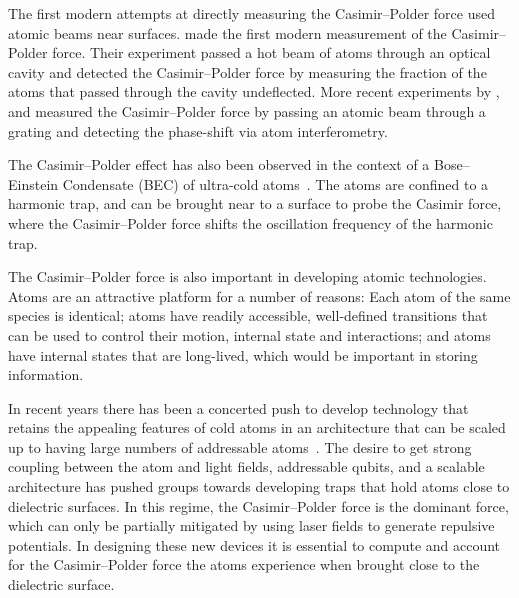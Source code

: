 The first modern attempts at directly measuring the Casimir--Polder force used atomic beams 
near surfaces.  \citet{Sukenik1993} made the first modern measurement of the Casimir--Polder force.
Their experiment passed a hot beam of atoms through an optical cavity and detected
the Casimir--Polder force by measuring the fraction of the atoms that passed through the cavity undeflected. 
More recent experiments by \citet{Perreault2005}, and \citet{Lonij2009} measured 
the Casimir--Polder force by passing an atomic beam through a grating and detecting the phase-shift via atom interferometry.  

The Casimir--Polder effect has also been observed in the context of a Bose--Einstein Condensate (BEC)
of ultra-cold atoms~\citep{Harber2005,Obrecht2007}.  %
The atoms are confined to a harmonic trap, and can be brought near to a surface to probe the Casimir
force, where the Casimir--Polder force shifts the oscillation frequency of the harmonic trap.

The Casimir--Polder force is also important in developing atomic technologies.  
Atoms are an attractive platform for a number of reasons:
Each atom of the same species is identical; 
atoms have readily accessible, well-defined transitions that can be used to control their motion,
internal state and interactions; and atoms
have internal states that are long-lived, which would be important in storing information.

In recent years there has been a concerted push to develop technology that retains the appealing features 
of cold atoms in an architecture that can be scaled up to having large numbers of addressable 
atoms~\citep{Kimble2008}.  
The desire to get strong coupling between the atom and light fields, addressable qubits, and a scalable
architecture has pushed groups towards developing traps that hold atoms close to dielectric surfaces.  
In this regime, the Casimir--Polder force is the dominant force, which can only be partially mitigated
by using laser fields to generate repulsive potentials.
In designing these new devices it is essential to compute and account for the Casimir--Polder force
the atoms experience when brought close to the dielectric surface.  


